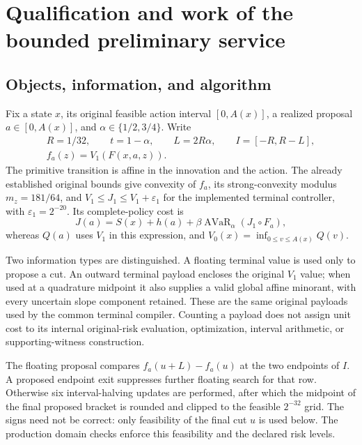 \section{Qualification and work of the bounded preliminary service}
\label{supp:budgetedtail119}

\subsection{Objects, information, and algorithm}
Fix a state $x$, its original feasible action interval $[0,A(x)]$, a
realized proposal $a\in[0,A(x)]$, and
$\alpha\in\{1/2,3/4\}$.  Write
\[
\begin{gathered}
 R=1/32,\qquad t=1-\alpha,\qquad L=2R\alpha,\qquad I=[-R,R-L],\\
 f_a(z)=V_1(F(x,a,z)).
\end{gathered}
\]
The primitive transition is affine in the innovation and the action.
The already established original bounds give convexity of $f_a$,
its strong-convexity modulus $m_z=181/64$, and
$V_1\le J_1\le V_1+\varepsilon_1$ for the implemented terminal
controller, with $\varepsilon_1=2^{-20}$.  Its complete-policy cost is
\[
 J(a)=S(x)+h(a)+\beta\operatorname{AVaR}_\alpha(J_1\circ F_a),
\]
whereas $Q(a)$ uses $V_1$ in this expression, and
$V_0(x)=\inf_{0\le v\le A(x)}Q(v)$.

Two information types are distinguished.  A floating terminal value
is used only to propose a cut.  An outward terminal payload encloses
the original $V_1$ value; when used at a quadrature midpoint it also
supplies a valid global affine minorant, with every uncertain slope
component retained.  These are the same original payloads used by the
common terminal compiler.  Counting a payload does not assign unit
cost to its internal original-risk evaluation, optimization, interval
arithmetic, or supporting-witness construction.

The floating proposal compares $f_a(u+L)-f_a(u)$ at the two endpoints
of $I$.  A proposed endpoint exit suppresses further floating search
for that row.  Otherwise six interval-halving updates are performed,
after which the midpoint of the final proposed bracket is rounded and
clipped to the feasible $2^{-32}$ grid.  The signs need not be correct:
only feasibility of the final cut $u$ is used below.  The production
domain checks enforce this feasibility and the declared risk levels.

